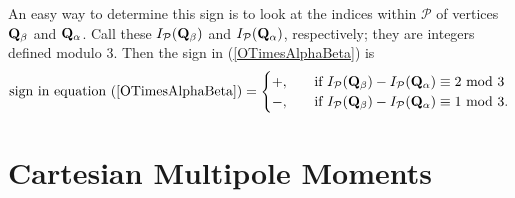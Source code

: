 \documentclass[letterpaper]{article}
\begin{document}
An easy way to determine this sign is to look at the 
indices within $\mathcal{P}$ of vertices $\mathbf{Q}_\beta$
and $\mathbf{Q}_\alpha$. Call these $I_{\mathcal{P}}(\mathbf{Q}_\beta)$ and 
$I_{\mathcal{P}}(\mathbf{Q}_\alpha)$, respectively; they are integers
defined modulo 3. Then the sign in (\ref{OTimesAlphaBeta})
is 
$$ \text{sign in equation (\ref{OTimesAlphaBeta})} 
   = 
   \begin{cases}
   +, \quad &\text{if } I_{\mathcal{P}}(\mathbf{Q}_\beta)
                       -I_{\mathcal{P}}(\mathbf{Q}_\alpha)
                        \equiv 2 \text{ mod } 3 
   \\
   -, \quad &\text{if } I_{\mathcal{P}}(\mathbf{Q}_\beta)
                       -I_{\mathcal{P}}(\mathbf{Q}_\alpha)
                        \equiv 1 \text{ mod } 3.
   \end{cases}
$$

\newpage
\section{Cartesian Multipole Moments}
\end{document}
